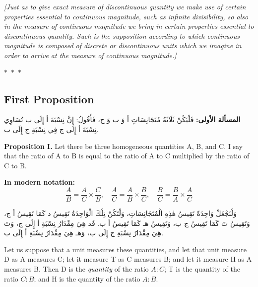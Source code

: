 \documentclass[11pt,a4paper]{article}
\theoremstyle{plain}
\theoremstyle{definition}
\theoremstyle{remark}
\newcommand{\ar}[1]{{\arabicfont\beginR #1\endR}}
\newcommand{\bilingualpair}[2]{%
  \par\noindent
  \begin{minipage}[t]{0.48\textwidth}
  #1
  \end{minipage}%
  \hfill
  \begin{minipage}[t]{0.48\textwidth}
  \vspace*{0pt}#2
  \end{minipage}\par\vspace{0.3cm}%
}
\newcommand{\ornament}{\begin{center}\textcolor{goldaccent}{$\ast$~$\ast$~$\ast$}\end{center}}
\begin{document}
\vspace{0.5cm}

\noindent\textit{[Just as to give exact measure of discontinuous quantity we make use of certain properties essential to continuous magnitude, such as infinite divisibility, so also in the measure of continuous magnitude we bring in certain properties essential to discontinuous quantity. Such is the supposition according to which continuous magnitude is composed of discrete or discontinuous units which we imagine in order to arrive at the measure of continuous magnitude.]}

\ornament

\subsection{First Proposition}
\label{prop:1}

\bilingualpair{\ar{\textbf{المسألة الأولى:} فَلْيَكُنْ ثَلَاثَةُ مُتَجَانِسَاتٍ أ وَ ب وَ ج، فَأَقُولُ: إِنَّ نِسْبَةَ أ إِلَى ب تُسَاوِي نِسْبَةَ أ إِلَى ج فِي نِسْبَةِ ج إِلَى ب.}}{\noindent\textbf{Proposition I.} Let there be three homogeneous quantities A, B, and C. I say that the ratio of A to B is equal to the ratio of A to C multiplied by the ratio of C to B.}

\vspace{0.3cm}

\begin{center}
\textbf{In modern notation:}
\[
\frac{A}{B} = \frac{A}{C} \times \frac{C}{B}, \quad
\frac{A}{C} = \frac{A}{B} \times \frac{B}{C}, \quad
\frac{B}{C} = \frac{B}{A} \times \frac{A}{C}
\]
\end{center}

\bilingualpair{\ar{وَلْنَجْعَلْ وَاحِدَةً تَقِيسُ هٰذِهِ الْمُتَجَانِسَاتِ، وَلْتَكُنْ تِلْكَ الْوَاحِدَةُ تَقِيسُ د كَمَا تَقِيسُ أ ج، وَتَقِيسُ تَ كَمَا تَقِيسُ ج ب، وَتَقِيسُ هـ كَمَا تَقِيسُ أ ب. فَد هِيَ مِقْدَارُ نِسْبَةِ أ إِلَى ج، وَتَ هِيَ مِقْدَارُ نِسْبَةِ ج إِلَى ب، وَهـ هِيَ مِقْدَارُ نِسْبَةِ أ إِلَى ب.}}{Let us suppose that a unit measures these quantities, and let that unit measure D as A measures C; let it measure T as C measures B; and let it measure H as A measures B. Then D is the \textit{quantity} of the ratio $A:C$; T is the quantity of the ratio $C:B$; and H is the quantity of the ratio $A:B$.}

\vspace{0.3cm}
\end{document}
